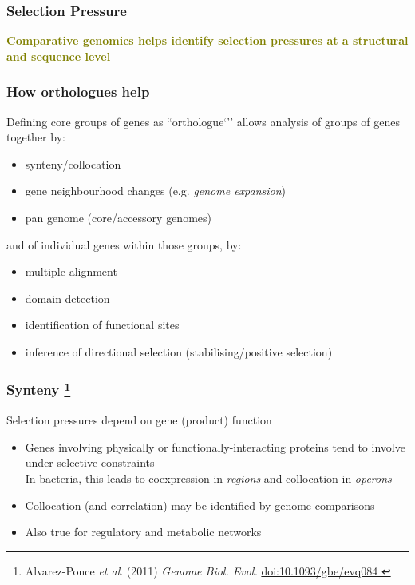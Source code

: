
%
\begin{frame}
  \frametitle{Selection Pressure
  }
  \Large{
    \textcolor{olive}{
      \textbf{
      Comparative genomics helps identify selection pressures at a structural and sequence level
      }
    }
  }
\end{frame}

%
\begin{frame}
  \frametitle{How orthologues help}
  \textcolor{hutton_green}{Defining core groups of genes as ``orthologue`'' allows analysis of groups of genes together by:}
  \begin{itemize}
    \item \textcolor{hutton_purple}{synteny/collocation}
    \item gene neighbourhood changes (e.g. \textcolor{hutton_purple}{\textit{genome expansion}})
    \item \textcolor{hutton_purple}{pan genome (core/accessory genomes)}
  \end{itemize}
  \textcolor{hutton_blue}{and of individual genes within those groups, by:}
  \begin{itemize}
    \item multiple alignment
    \item domain detection
    \item identification of functional sites
    \item inference of directional selection (stabilising/positive selection)
  \end{itemize}  
\end{frame}

%
\begin{frame}
  \frametitle{Synteny
    \footnote{\tiny{Alvarez-Ponce \textit{et al}. (2011) \textit{Genome Biol. Evol.} \href{http://dx.doi.org/10.1093/gbe/evq084}{doi:10.1093/gbe/evq084
  }}}
}
  Selection pressures depend on gene (product) function
  \begin{itemize}
    \item \textcolor{hutton_green}{Genes involving physically or functionally-interacting proteins tend to involve under selective constraints} \\
    In bacteria, this leads to coexpression in \textit{regions} and collocation in \textit{operons}
    \item \textcolor{hutton_blue}{Collocation (and correlation) may be identified by genome comparisons}
    \item \textcolor{RawSienna}{Also true for regulatory and metabolic networks}
  \end{itemize}  
\end{frame}

